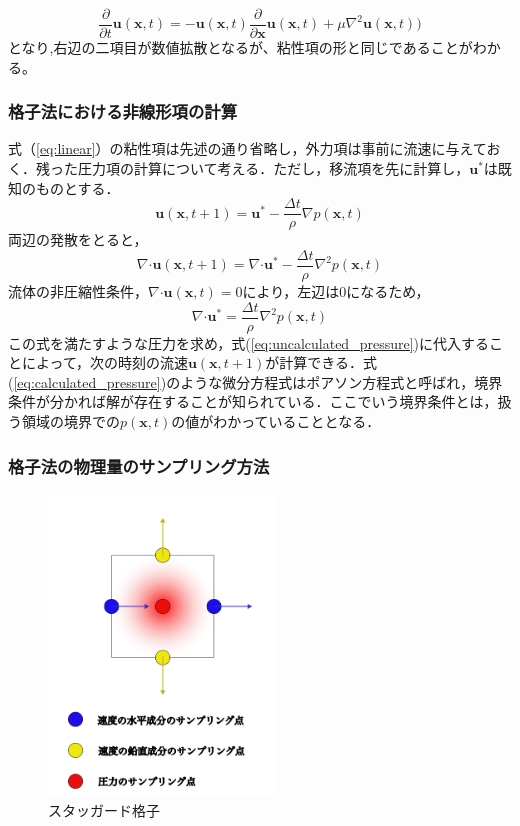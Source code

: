 \documentclass[a4j,12pt]{jreport}
\begin{document}
$$ \frac{\partial}{\partial t}\bm{u}(\bm{x},t) =  -\bm{u}(\bm{x},t)\frac{\partial}{\partial \bm{x}}\bm{u}(\bm{x},t) +\mu\nabla^2\bm{u}(\bm{x},t))$$
となり,右辺の二項目が数値拡散となるが、粘性項の形と同じであることがわかる。
\subsubsection{格子法における非線形項の計算} \label{subsec:gridpressure}
式（\ref{eq:linear}）の粘性項は先述の通り省略し，外力項は事前に流速に与えておく．残った圧力項の計算について考える．ただし，移流項を先に計算し，$\bm{u}^*$は既知のものとする．
\begin{equation}\label{eq:uncalculated_pressure}
\bm{u}(\bm{x},t+1) =  \bm{u}^* - \frac{\Delta t}{\rho}\nabla p(\bm{x},t)
\end{equation} 
両辺の発散をとると，
$$\nabla\boldsymbol{\cdot}\bm{u}(\bm{x},t+1) =  \nabla\boldsymbol{\cdot}\bm{u}^* - \frac{\Delta t}{\rho}\nabla^2 p(\bm{x},t)$$
流体の非圧縮性条件，$\nabla\boldsymbol{\cdot}\bm{u}(\bm{x},t) = 0$により，左辺は0になるため，
\begin{equation}\label{eq:calculated_pressure}
\nabla\boldsymbol{\cdot}\bm{u}^* = \frac{\Delta t}{\rho}\nabla^2 p(\bm{x},t)
\end{equation} 
この式を満たすような圧力を求め，式(\ref{eq:uncalculated_pressure})に代入することによって，次の時刻の流速$\bm{u}(\bm{x},t+1)$が計算できる．式(\ref{eq:calculated_pressure})のような微分方程式はポアソン方程式と呼ばれ，境界条件が分かれば解が存在することが知られている．ここでいう境界条件とは，扱う領域の境界での$p(\bm{x},t)$の値がわかっていることとなる．
\subsubsection{格子法の物理量のサンプリング方法} \label{subsec:grid_sampling}
\begin{figure}[htbp]
\begin{center}
\includegraphics[width=60mm]{staggerd.png}
\caption{スタッガード格子}
\end{center}
\end{figure}
\end{document}
